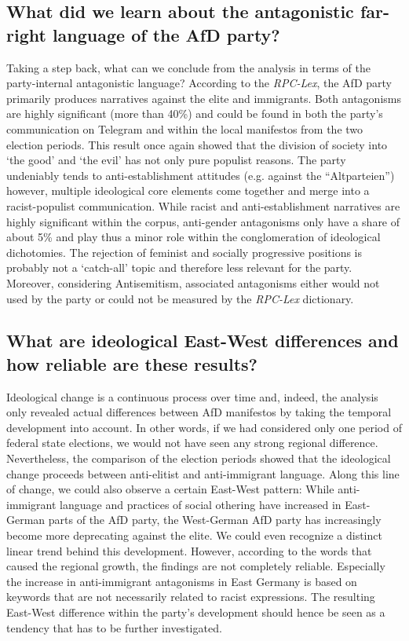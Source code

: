 \documentclass[a4paper]{scrreprt}
\begin{document}
\subsection*{What did we learn about the antagonistic far-right language of the AfD party?}
Taking a step back, what can we conclude from the analysis in terms of the party-internal antagonistic language? According to the {\em RPC-Lex}, the AfD party primarily produces narratives against the elite and immigrants. Both antagonisms are highly significant (more than 40\%) and could be found in both the party's communication on Telegram and within the local manifestos from the two election periods. This result once again showed that the division of society into `the good' and `the evil' has not only pure populist reasons. The party undeniably tends to anti-establishment attitudes (e.g. against the ``Altparteien'') however, multiple ideological core elements come together and merge into a racist-populist communication. While racist and anti-establishment narratives are highly significant within the corpus, anti-gender antagonisms only have a share of about 5\% and play thus a minor role within the conglomeration of ideological dichotomies. The rejection of feminist and socially progressive positions is probably not a `catch-all' topic and therefore less relevant for the party. Moreover, considering Antisemitism, associated antagonisms either would not used by the party or could not be measured by the {\em RPC-Lex} dictionary.
\subsection*{What are ideological East-West differences and how reliable are these results?}
Ideological change is a continuous process over time and, indeed, the analysis only revealed actual differences between AfD manifestos by taking the temporal development into account. In other words, if we had considered only one period of federal state elections, we would not have seen any strong regional difference. Nevertheless, the comparison of the election periods showed that the ideological change proceeds between anti-elitist and anti-immigrant language. Along this line of change, we could also observe a certain East-West pattern: While anti-immigrant language and practices of social othering have increased in East-German parts of the AfD party, the West-German AfD party has increasingly become more deprecating against the elite. We could even recognize a distinct linear trend behind this development. However, according to the words that caused the regional growth, the findings are not completely reliable. Especially the increase in anti-immigrant antagonisms in East Germany is based on keywords that are not necessarily related to racist expressions. The resulting East-West difference within the party's development should hence be seen as a tendency that has to be further investigated.
\end{document}
